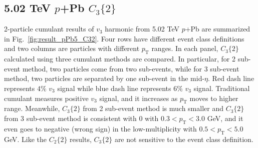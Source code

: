 \subsection{5.02 TeV $p$+Pb $C_{3}\{2\}$}
2-particle cumulant results of $v_{3}$ harmonic from 5.02 TeV $p$+Pb are summarized in Fig.~\ref{fig:result_pPb5_C32}. Four rows have different event class definitions and two columns are particles with different $p_{\text{T}}$ ranges. In each panel, $C_{3}\{2\}$ calculated using three cumulant methods are compared. In particular, for 2 sub-event method, two particles come from two sub-events, while for 3 sub-event method, two particles are separated by one sub-event in the mid-$\eta$. Red dash line represents $4\%$ $v_{3}$ signal while blue dash line represents $6\%$ $v_{3}$ signal. Traditional cumulant measures positive $v_{3}$ signal, and it increases as $p_{\text{T}}$ moves to higher range. Meanwhile, $C_{3}\{2\}$ from 2 sub-event method is much smaller and $C_{3}\{2\}$ from 3 sub-event method is consistent with 0 with $0.3<p_{\text{T}}<3.0$ GeV, and it even goes to negative (wrong sign) in the low-multiplicity with $0.5<p_{\text{T}}<5.0$ GeV. Like the $C_{2}\{2\}$ results, $C_{3}\{2\}$ are not sensitive to the event class definition.
